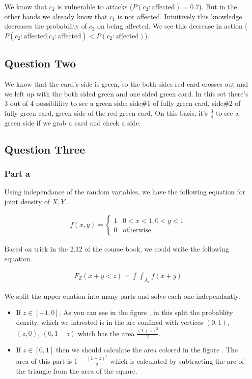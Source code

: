 \documentclass[12pt, a4paper]{book}
\begin{document}
We know that $c_2$ is vulnerable to attacks ($P(c_2:\text{affected}) = 0.7$). But in the other hands we
already know that $c_1$ is not affected. Intuitively this knowledge decreases the probability of $c_2$ on being
affected. We see this decrease in action ($P(c_2: \text{affected}| c_1: \overline{\text{affected}}) < P(c_2: \text{affected})$).

\subsection*{Question Two}

We know that the card's side is green, so the both sides red card crosses out and we left up with the
both sided green and one sided green card. In this set there's 3 out of 4 possiblility to see a green side:
side\#1 of fully green card, side\#2 of fully green card, green side of the red-green card. On this basis,
it's $\frac{3}{4}$ to see a green side if we grab a card and check a side.

\subsection*{Question Three}

\subsubsection*{Part a}

Using independance of the random variables, we have the following equation for joint density of $X, Y$.

\begin{eqnarray*}
    f(x,y) = \begin{cases}
        1 & 0 < x < 1, 0 < y < 1 \\
        0 & \text{otherwise}
    \end{cases}
\end{eqnarray*}

Based on trick in the 2.12 of the course book, we could write the following equation.

\begin{eqnarray*}
    F_Z(x+y < z) = \int\int_{A_z} f(x+y)
\end{eqnarray*}

We split the upper euation into many parts and solve each one independantly.

\begin{itemize}
    \item If $z \in [-1, 0]$, As you can see in the figure {}, in this split the probablity density, which we intrested is in the are confined
    with vertices $(0,1)$, $(z,0)$, $(0, 1-z)$ which has the area $\frac{(1+z)^2}{2}$.
    \item If $z \in [0,1]$ then we should calculate the area colored in the figure {}. The area of this
    part is $1 - \frac{(1-z)^2}{2}$ which is calculated by subtracting the are of the triangle from the area of the square.
\end{itemize}
\end{document}
